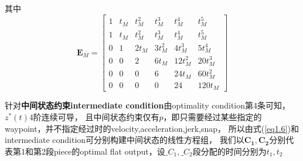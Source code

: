 \documentclass[40pt,a4paper,UTF8,twocolumn]{ctexart}%
\numberwithin{equation}{section}
\begin{document}
其中
\begin{equation}
    \bm E_M=
    \begin{bmatrix}
        1&t_M&t_M^2&t_M^3&t_M^4&t_M^5 \\
        1&t_M&t_M^2&t_M^3&t_M^4&t_M^5 \\
        0&1&2t_M&3t_M^2&4t_M^3&5t_M^4 \\
        0&0&2&6t_M&12t_M^2&20t_M^3 \\
        0&0&0&6&24t_M&60t_M^2 \\
        0&0&0&0&24&120t_M
    \end{bmatrix}
\end{equation}


针对\textbf{中间状态约束intermediate condition}由optimality condition第4条可知，$z^*(t)$4阶连续可导，
且中间状态约束仅有$p$，即只需要经过某些指定的waypoint，并不指定经过时的velocity,acceleration,jerk,snap，
所以由式(\ref{eq1.6})和intermediate condition可分别构建中间状态的线性方程组，
我们以$\bm{C_1},\bm{C_2}$分别代表第1和第2段piece的optimal flat output，设$\bm_{C_1},\bm_{C_2}$段分配的时间分别为$t_1,t_2$
\end{document}
